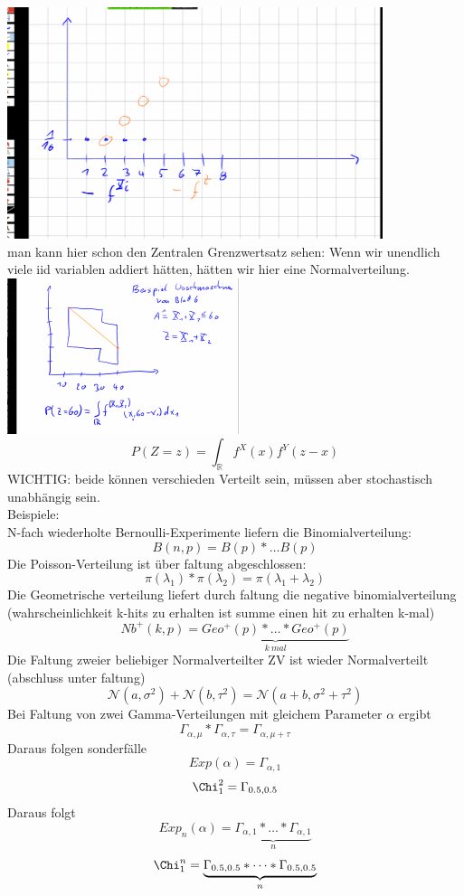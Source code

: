 \documentclass{article}
\begin{document}
	\includegraphics[height=256px]{z-Prob-Graph.png}\\
	man kann hier schon den Zentralen Grenzwertsatz sehen: Wenn wir unendlich viele iid variablen addiert hätten, hätten wir hier eine Normalverteilung.\\
	\includegraphics[width=256px]{kontinuierlicheFaltung.png}\\
	\[P(Z=z)=\int_\mathbb{R} f^X(x)f^Y(z-x)\]
	WICHTIG: beide können verschieden Verteilt sein, müssen aber stochastisch unabhängig sein.\\
	Beispiele:\\
	N-fach wiederholte Bernoulli-Experimente liefern die Binomialverteilung:\\
	\[B(n,p)=B(p)*\dots B(p)\]
	Die Poisson-Verteilung ist über faltung abgeschlossen:
	\[\pi(\lambda_1)*\pi(\lambda_2)=\pi(\lambda_1+\lambda_2)\]
	Die Geometrische verteilung liefert durch faltung die negative binomialverteilung (wahrscheinlichkeit k-hits zu erhalten ist summe einen hit zu erhalten k-mal)
	\[Nb^+(k,p)=\underbrace{Geo^+(p)*\dots*Geo^+(p)}_{k\ mal}\]
	Die Faltung zweier beliebiger Normalverteilter ZV ist wieder Normalverteilt (abschluss unter faltung)
	\[\mathcal{N}(a,\sigma^2)+\mathcal{N}(b,\tau^2) = \mathcal{N}(a+b,\sigma^2+\tau^2)\]
	Bei Faltung von zwei Gamma-Verteilungen mit gleichem Parameter $\alpha$ ergibt
	\[\Gamma_{\alpha,\mu}*\Gamma_{\alpha,\tau}=\Gamma_{\alpha,\mu+\tau}\]
	Daraus folgen sonderfälle
	\[Exp(\alpha)=\Gamma_{\alpha,1}\]
	\[\Chi_1^2=\Gamma_{0.5,0.5}\]
	Daraus folgt
	\[Exp_n(\alpha)=\underbrace{\Gamma_{\alpha,1}*\dots* \Gamma_{\alpha,1}}_n\]
	\[\Chi_1^n=\underbrace{\Gamma_{0.5,0.5}*\dots *\Gamma_{0.5,0.5}}_n\]
\end{document}
